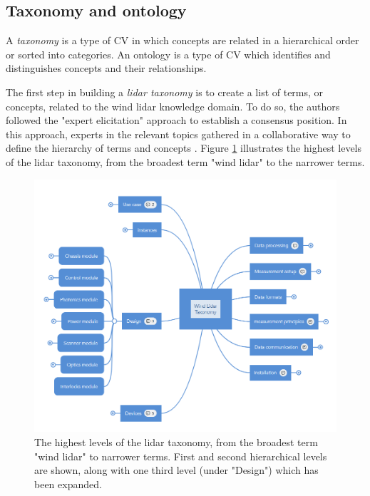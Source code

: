 \documentclass[remotesensing,article,submit,pdftex,moreauthors]{Definitions/mdpi}
\begin{document}

\subsection{Taxonomy and ontology}
A {\it taxonomy} is a type of CV in which concepts are related in a hierarchical order or sorted into categories. An ontology is a type of CV which identifies and distinguishes concepts and their relationships.

The first step in building a {\it lidar taxonomy} is to create a list of terms, or concepts, related to the wind lidar knowledge domain. To do so, the authors followed the "expert elicitation" approach to establish a consensus position. In this approach, experts in the relevant topics gathered in a collaborative way to define the hierarchy of terms and concepts \cite{ref-IRPWind}. Figure \ref{fig:tax} illustrates the highest levels of the lidar taxonomy, from the broadest term "wind lidar" to the narrower terms.

\begin{figure}[h]
    \centering
    \includegraphics[width=12cm]{Figures/MindMap.PNG}
    \caption{The highest levels of the lidar taxonomy, from the broadest term "wind lidar" to narrower terms. First and second hierarchical levels are shown, along with one third level (under "Design") which has been expanded.}
    \label{fig:tax}
\end{figure}
\end{document}

